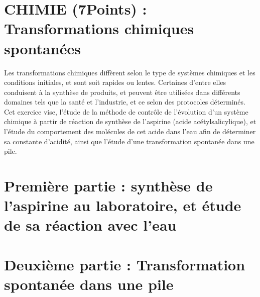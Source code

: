 \section*{CHIMIE (7Points) : Transformations chimiques spontanées}
Les transformations chimiques diffèrent selon le type de systèmes chimiques et les conditions initiales, et sont soit rapides ou lentes. Certaines d'entre elles conduisent à la synthèse de produits, et peuvent être utilisées dans différents domaines tels que la santé et l'industrie, et ce selon des protocoles déterminés.\\
Cet exercice vise, l'étude de la méthode de contrôle de l'évolution d'un système chimique à partir de réaction de synthèse de l'aspirine (acide acétylsalicylique), et l'étude du comportement des molécules de cet acide dans l'eau afin de déterminer sa constante d'acidité, ainsi que l'étude d'une transformation spontanée dans une pile.\\

\section*{Première partie : synthèse de l'aspirine au laboratoire, et étude de sa réaction avec l'eau}


\section*{Deuxième partie : Transformation spontanée dans une pile}

